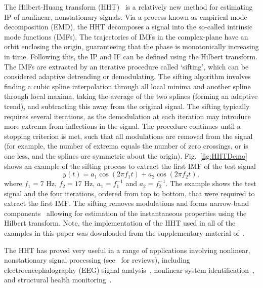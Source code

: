 \documentclass[a4paper]{IEEEtran}
\begin{document}
The Hilbert-Huang transform (HHT)~\cite{Huang1998} is a relatively new method for estimating IP of nonlinear, nonstationary signals. Via a process known as empirical mode decomposition (EMD), the HHT decomposes a signal into the so-called intrinsic mode functions (IMFs). The trajectories of IMFs in the complex-plane have an orbit enclosing the origin, guaranteeing that the phase is monotonically increasing in time. Following this, the IP and IF can be defined using the Hilbert transform. The IMFs are extracted by an iterative procedure called `sifting', which can be considered adaptive detrending or demodulating. The sifting algorithm involves finding a cubic spline interpolation through all local minima and another spline through local maxima, taking the average of the two splines (forming an adaptive trend), and subtracting this away from the original signal. The sifting typically requires several iterations, as the demodulation at each iteration may introduce more extrema from inflections in the signal. The procedure continues until a stopping criterion is met, such that all modulations are removed from the signal (for example, the number of extrema equals the number of zero crossings, or is one less, and the splines are symmetric about the origin). Fig.~\ref{fig:HHTDemo} shows an example of the sifting process to extract the first IMF of the test signal
\begin{equation}\label{eq:FirstTestSig}
y\left( t \right) = a_1\cos \left(2\pi f_1t\right) + a_2\cos \left(2\pi f_2t \right),
\end{equation}
where $f_1 = 7$ Hz, $f_2 = 17$ Hz, $a_1 = f_1^{-1}$ and $a_2=f_2^{-1}$. The example shows the test signal and the four iterations, ordered from top to bottom, that were required to extract the first IMF. The sifting removes modulations and forms narrow-band components~\cite{Huang1998} allowing for estimation of the instantaneous properties using the Hilbert transform. Note, the implementation of the HHT used in all of the examples in this paper was downloaded from the supplementary material of~\cite{Wu2009}. 

The HHT has proved very useful in a range of applications involving nonlinear, nonstationary signal processing (see~\cite{Huang2008,Huang2005a} for reviews), including electroencephalography (EEG) signal analysis~\cite{Wang2008}, nonlinear system identification~\cite{Huang2005b}, and structural health monitoring~\cite{Pai2008}.
\end{document}
